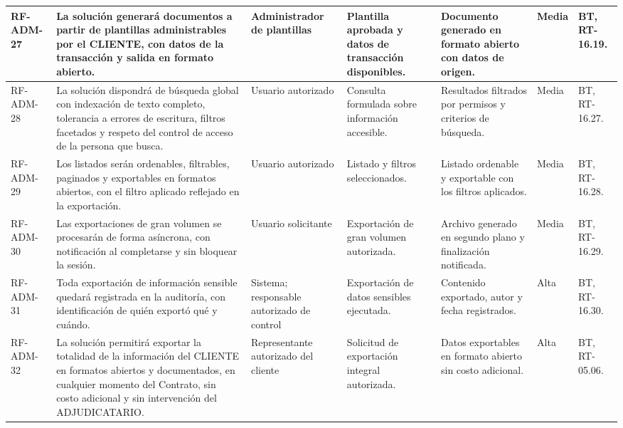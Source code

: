 \begin{longtable}{|L{0.080645\AnchoTablaAnexo}|L{0.262097\AnchoTablaAnexo}|L{0.100806\AnchoTablaAnexo}|L{0.145161\AnchoTablaAnexo}|L{0.173387\AnchoTablaAnexo}|L{0.060484\AnchoTablaAnexo}|L{0.177420\AnchoTablaAnexo}|}
RF-\allowbreak{}ADM-\allowbreak{}27 &
La solución generará documentos a partir de plantillas administrables por el CLIENTE, con datos de la transacción y salida en formato abierto. &
Administrador de plantillas &
Plantilla aprobada y datos de transacción disponibles. &
Documento generado en formato abierto con datos de origen. &
Media &
BT, RT-16.19. \\ \hline

RF-\allowbreak{}ADM-\allowbreak{}28 &
La solución dispondrá de búsqueda global con indexación de texto completo, tolerancia a errores de escritura, filtros facetados y respeto del control de acceso de la persona que busca. &
Usuario autorizado &
Consulta formulada sobre información accesible. &
Resultados filtrados por permisos y criterios de búsqueda. &
Media &
BT, RT-16.27. \\ \hline

RF-\allowbreak{}ADM-\allowbreak{}29 &
Los listados serán ordenables, filtrables, paginados y exportables en formatos abiertos, con el filtro aplicado reflejado en la exportación. &
Usuario autorizado &
Listado y filtros seleccionados. &
Listado ordenable y exportable con los filtros aplicados. &
Media &
BT, RT-16.28. \\ \hline

RF-\allowbreak{}ADM-\allowbreak{}30 &
Las exportaciones de gran volumen se procesarán de forma asíncrona, con notificación al completarse y sin bloquear la sesión. &
Usuario solicitante &
Exportación de gran volumen autorizada. &
Archivo generado en segundo plano y finalización notificada. &
Media &
BT, RT-16.29. \\ \hline

RF-\allowbreak{}ADM-\allowbreak{}31 &
Toda exportación de información sensible quedará registrada en la auditoría, con identificación de quién exportó qué y cuándo. &
Sistema; responsable autorizado de control &
Exportación de datos sensibles ejecutada. &
Contenido exportado, autor y fecha registrados. &
Alta &
BT, RT-16.30. \\ \hline

RF-\allowbreak{}ADM-\allowbreak{}32 &
La solución permitirá exportar la totalidad de la información del CLIENTE en formatos abiertos y documentados, en cualquier momento del Contrato, sin costo adicional y sin intervención del ADJUDICATARIO. &
Representante autorizado del cliente &
Solicitud de exportación integral autorizada. &
Datos exportables en formato abierto sin costo adicional. &
Alta &
BT, RT-05.06. \\ \hline


\end{longtable}
